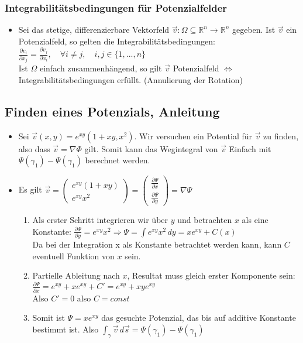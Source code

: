 \documentclass[a3paper, 11pt, landscape]{scrartcl}
\newcommand{\Rn}{\mathbb{R}^n}
\begin{document}
\begin{multicols*}{3}
	\subsubsection{Integrabilitätsbedingungen für Potenzialfelder}
	\begin{itemize}
	    \item Sei das stetige, differenzierbare Vektorfeld $\vec{v}:\Omega\subseteq\Rn\to\Rn$ gegeben. Ist $\vec{v}$ ein Potenzialfeld, so gelten die Integrabilitätsbedingungen: \\
	    $\frac{\partial v_i}{\partial x_j}=\frac{\partial v_j}{\partial x_i},\quad \forall i\neq j,\quad i,j\in\{1,...,n\}$\\
	    Ist $\Omega$ einfach zusammenhängend, so gilt $\vec{v}$ Potenzialfeld $\iff $ Integrabilitätsbedingungen erfüllt. (Annulierung der Rotation)
	\end{itemize}
	\subsection{Finden eines Potenzials, Anleitung}
	\begin{itemize}
	    \item Sei $\vec{v}(x,y)=e^{xy}(1+xy,x^2)$. Wir versuchen ein Potential für $\vec{v}$ zu finden, also dass $\vec{v}=\nabla \Phi$ gilt. Somit kann das Wegintegral von $\vec{v}$ Einfach mit $\Psi(\gamma_1)-\Psi(\gamma_1)$ berechnet werden.
	    \item Es gilt $\vec{v}=\begin{pmatrix}
	    e^{xy}(1+xy) \\ e^{xy}x^2
	    \end{pmatrix}= \begin{pmatrix}
	        \frac{\partial\Psi}{\partial x} \\ \frac{\partial\Psi}{\partial y}
	    \end{pmatrix} = \nabla \Psi$ 
	    \begin{enumerate}
	        \item Als erster Schritt integrieren wir über $y$ und betrachten $x$ als eine Konstante: $\frac{\partial \Psi}{\partial y}=e^{xy}x^2\Rightarrow \Psi = \int e^{xy} x^2\,dy = xe^{xy}+C(x)$\\
	        Da bei der Integration x als Konstante betrachtet werden kann, kann $C$ eventuell Funktion von $x$ sein.
	        \item Partielle Ableitung nach $x$, Resultat muss gleich erster Komponente sein: $\frac{\partial \Psi}{\partial x}=e^{xy}+xe^{xy}+C'=e^{xy}+xye^{xy}$\\
	        Also $C'=0$ also $C=const$
	        \item Somit ist $\Psi=xe^{xy}$ das gesuchte Potenzial, das bis auf additive Konstante bestimmt ist. Also $\int_\gamma \vec{v}\,d\vec{s}=\Psi(\gamma_1)-\Psi(\gamma_1)$
	    \end{enumerate}
	\end{itemize}
	

\end{multicols*}
\end{document}
